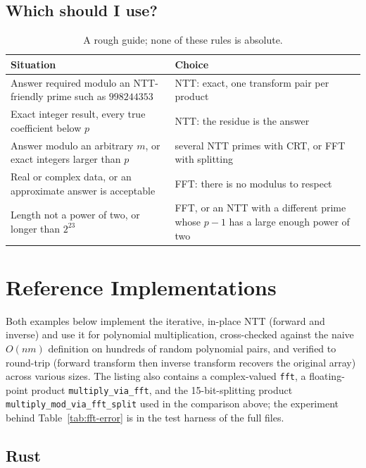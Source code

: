 \documentclass[11pt]{article}
\begin{document}
\subsection{Which should I use?}
\begin{table}[H]
\centering
\small\sffamily\renewcommand{\arraystretch}{1.25}
\begin{tabular}{@{}p{6.6cm}p{8.4cm}@{}}
\toprule
\textbf{Situation} & \textbf{Choice} \\
\midrule
Answer required modulo an NTT-friendly prime such as $998244353$ & NTT: exact, one transform pair per product \\
Exact integer result, every true coefficient below $p$ & NTT: the residue is the answer \\
Answer modulo an arbitrary $m$, or exact integers larger than $p$ & several NTT primes with CRT, or FFT with splitting \\
Real or complex data, or an approximate answer is acceptable & FFT: there is no modulus to respect \\
Length not a power of two, or longer than $2^{23}$ & FFT, or an NTT with a different prime whose $p-1$ has a large enough power of two \\
\bottomrule
\end{tabular}
\caption{A rough guide; none of these rules is absolute.}
\end{table}

\section{Reference Implementations}
Both examples below implement the iterative, in-place NTT (forward and
inverse) and use it for polynomial multiplication, cross-checked against
the naive $O(nm)$ definition on hundreds of random polynomial pairs, and
verified to round-trip (forward transform then inverse transform recovers
the original array) across various sizes. The listing also contains a
complex-valued \texttt{fft}, a floating-point product \texttt{multiply\_via\_fft}, and the
15-bit-splitting product \texttt{multiply\_mod\_via\_fft\_split} used in the comparison above; the
experiment behind Table~\ref{tab:fft-error} is in the test harness of the full files.

\codenote
\subsection{Rust}
\end{document}
